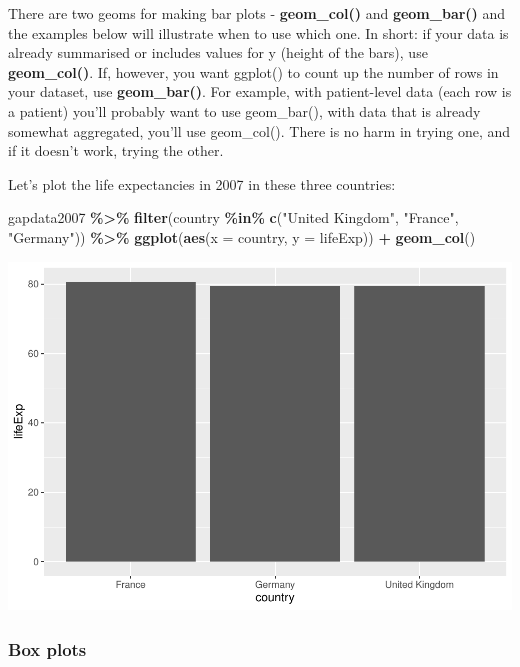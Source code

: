 \documentclass[
]{book}
\newenvironment{Shaded}{\begin{snugshade}}{\end{snugshade}}
\newcommand{\AttributeTok}[1]{\textcolor[rgb]{0.13,0.29,0.53}{#1}}
\newcommand{\FunctionTok}[1]{\textcolor[rgb]{0.13,0.29,0.53}{\textbf{#1}}}
\newcommand{\NormalTok}[1]{#1}
\newcommand{\SpecialCharTok}[1]{\textcolor[rgb]{0.81,0.36,0.00}{\textbf{#1}}}
\newcommand{\StringTok}[1]{\textcolor[rgb]{0.31,0.60,0.02}{#1}}
\begin{document}
There are two geoms for making bar plots - \textbf{geom\_col()} and \textbf{geom\_bar()} and the examples below will illustrate when to use which one. In short: if your data is already summarised or includes values for y (height of the bars), use \textbf{geom\_col()}. If, however, you want ggplot() to count up the number of rows in your dataset, use \textbf{geom\_bar()}. For example, with patient-level data (each row is a patient) you'll probably want to use geom\_bar(), with data that is already somewhat aggregated, you'll use geom\_col(). There is no harm in trying one, and if it doesn't work, trying the other.

Let's plot the life expectancies in 2007 in these three countries:

\begin{Shaded}
\begin{Highlighting}[]
\NormalTok{gapdata2007 }\SpecialCharTok{\%\textgreater{}\%}
\FunctionTok{filter}\NormalTok{(country }\SpecialCharTok{\%in\%} \FunctionTok{c}\NormalTok{(}\StringTok{"United Kingdom"}\NormalTok{, }\StringTok{"France"}\NormalTok{, }\StringTok{"Germany"}\NormalTok{)) }\SpecialCharTok{\%\textgreater{}\%}
\FunctionTok{ggplot}\NormalTok{(}\FunctionTok{aes}\NormalTok{(}\AttributeTok{x =}\NormalTok{ country, }\AttributeTok{y =}\NormalTok{ lifeExp)) }\SpecialCharTok{+}
\FunctionTok{geom\_col}\NormalTok{()}
\end{Highlighting}
\end{Shaded}

\includegraphics{_main_files/figure-latex/unnamed-chunk-78-1.pdf}

\subsubsection{Box plots}\label{box-plots}
\end{document}
